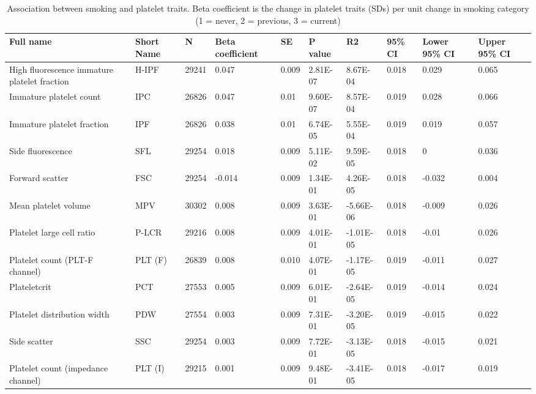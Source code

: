\documentclass[11pt,twoside]{bristolthesis}
\begin{document}
\begin{landscape}\begin{table}

\caption[Association between smoking and platelet traits]{\label{tab:smoking-platelets}Association between smoking and platelet traits. Beta coefficient is the change in platelet traits (SDs) per unit change in smoking category (1 = never, 2 = previous, 3 = current)}
\centering
\begin{tabu} to 
\toprule
Full name & Short Name & N & Βeta coefficient & SE & P value & R2 & 95\% CI & Lower 95\% CI & Upper 95\% CI\\
\midrule
High fluorescence immature platelet fraction & H-IPF & 29241 & 0.047 & 0.009 & 2.81E-07 & 8.67E-04 & 0.018 & 0.029 & 0.065\\
Immature platelet count & IPC & 26826 & 0.047 & 0.01 & 9.60E-07 & 8.57E-04 & 0.019 & 0.028 & 0.066\\
Immature platelet fraction & IPF & 26826 & 0.038 & 0.01 & 6.74E-05 & 5.55E-04 & 0.019 & 0.019 & 0.057\\
Side fluorescence & SFL & 29254 & 0.018 & 0.009 & 5.11E-02 & 9.59E-05 & 0.018 & 0 & 0.036\\
Forward scatter & FSC & 29254 & -0.014 & 0.009 & 1.34E-01 & 4.26E-05 & 0.018 & -0.032 & 0.004\\
\addlinespace
Mean platelet volume & MPV & 30302 & 0.008 & 0.009 & 3.63E-01 & -5.66E-06 & 0.018 & -0.009 & 0.026\\
Platelet large cell ratio & P-LCR & 29216 & 0.008 & 0.009 & 4.01E-01 & -1.01E-05 & 0.018 & -0.01 & 0.026\\
Platelet count (PLT-F channel) & PLT (F) & 26839 & 0.008 & 0.010 & 4.07E-01 & -1.17E-05 & 0.019 & -0.011 & 0.027\\
Plateletcrit & PCT & 27553 & 0.005 & 0.009 & 6.01E-01 & -2.64E-05 & 0.019 & -0.014 & 0.024\\
Platelet distribution width & PDW & 27554 & 0.003 & 0.009 & 7.31E-01 & -3.20E-05 & 0.019 & -0.015 & 0.022\\
\addlinespace
Side scatter & SSC & 29254 & 0.003 & 0.009 & 7.72E-01 & -3.13E-05 & 0.018 & -0.015 & 0.021\\
Platelet count (impedance channel) & PLT (I) & 29215 & 0.001 & 0.009 & 9.48E-01 & -3.41E-05 & 0.018 & -0.017 & 0.019\\
\bottomrule
\end{tabu}
\end{table}
\end{landscape}
\end{document}

